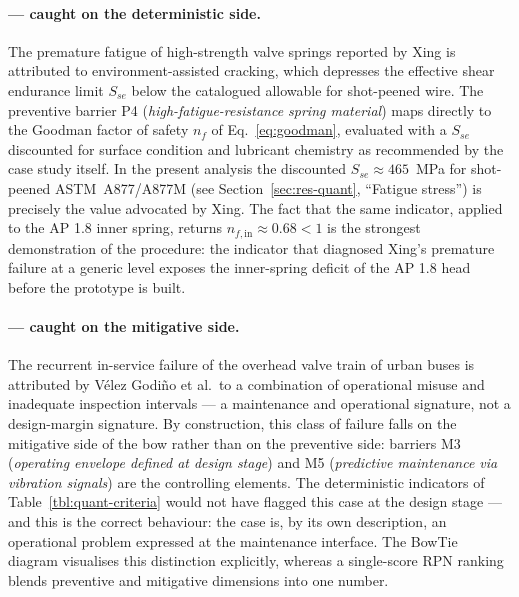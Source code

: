 \paragraph{\citet{xing2021valvespringEAC} --- caught on the
deterministic side.}
The premature fatigue of high-strength valve springs reported by
Xing is attributed to environment-assisted cracking, which depresses
the effective shear endurance limit $S_{se}$ below the catalogued
allowable for shot-peened wire. The preventive barrier P4
(\emph{high-fatigue-resistance spring material}) maps directly to
the Goodman factor of safety
$n_{f}$ of Eq.~\eqref{eq:goodman}, evaluated with a $S_{se}$
discounted for surface condition and lubricant chemistry as
recommended by the case study itself. In the present analysis the
discounted $S_{se}\approx 465$~MPa for shot-peened ASTM~A877/A877M
(see Section~\ref{sec:res-quant}, ``Fatigue stress'') is precisely
the value advocated by Xing. The fact that the same indicator,
applied to the AP 1.8 inner spring, returns
$n_{f,\mathrm{in}}\approx 0.68 < 1$ is the strongest demonstration
of the procedure: the indicator that diagnosed Xing's premature
failure at a generic level exposes the inner-spring deficit of the
AP 1.8 head before the prototype is built.

\paragraph{\citet{velezgodino2019overheadvalvetrain} --- caught on
the mitigative side.}
The recurrent in-service failure of the overhead valve train of
urban buses is attributed by V\'elez Godi\~no et al.\ to a
combination of operational misuse and inadequate inspection
intervals --- a maintenance and operational signature, not a
design-margin signature. By construction, this class of failure
falls on the mitigative side of the bow rather than on the
preventive side: barriers M3 (\emph{operating envelope defined at
design stage}) and M5 (\emph{predictive maintenance via vibration
signals}) are the controlling elements. The deterministic
indicators of Table~\ref{tbl:quant-criteria} would not have
flagged this case at the design stage --- and this is the correct
behaviour: the case is, by its own description, an operational
problem expressed at the maintenance interface. The BowTie diagram
visualises this distinction explicitly, whereas a single-score RPN
ranking blends preventive and mitigative dimensions into one number.

